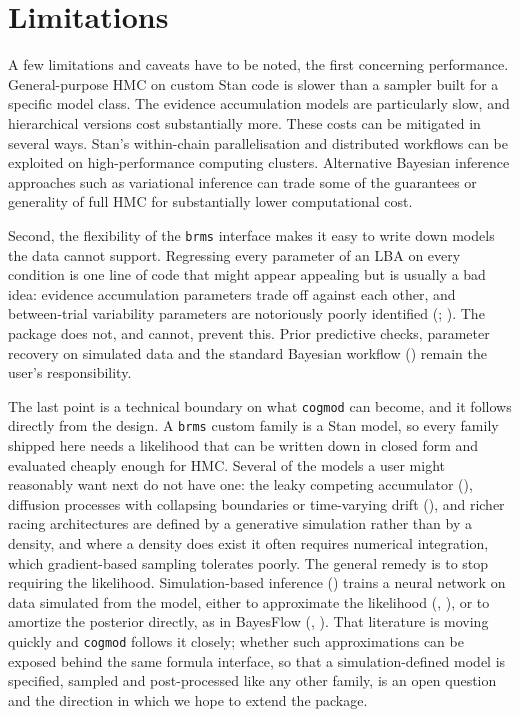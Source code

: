 \documentclass[
  jou,
  floatsintext,
  longtable,
  nolmodern,
  notxfonts,
  notimes,
  12pt,
  colorlinks=true,linkcolor=blue,citecolor=blue,urlcolor=blue]{apa7}
\begin{document}
\section{Limitations}\label{limitations}

A few limitations and caveats have to be noted, the first concerning
performance. General-purpose HMC on custom Stan code is slower than a
sampler built for a specific model class. The evidence accumulation
models are particularly slow, and hierarchical versions cost
substantially more. These costs can be mitigated in several ways. Stan's
within-chain parallelisation and distributed workflows can be exploited
on high-performance computing clusters. Alternative Bayesian inference
approaches such as variational inference can trade some of the
guarantees or generality of full HMC for substantially lower
computational cost.

Second, the flexibility of the \texttt{brms} interface makes it easy to
write down models the data cannot support. Regressing every parameter of
an LBA on every condition is one line of code that might appear
appealing but is usually a bad idea: evidence accumulation parameters
trade off against each other, and between-trial variability parameters
are notoriously poorly identified
(;
). The
package does not, and cannot, prevent this. Prior predictive checks,
parameter recovery on simulated data and the standard Bayesian workflow
() remain the
user's responsibility.

The last point is a technical boundary on what \texttt{cogmod} can
become, and it follows directly from the design. A \texttt{brms} custom
family is a Stan model, so every family shipped here needs a likelihood
that can be written down in closed form and evaluated cheaply enough for
HMC. Several of the models a user might reasonably want next do not have
one: the leaky competing accumulator (), diffusion processes with collapsing boundaries or
time-varying drift (), and richer racing architectures are defined by a generative
simulation rather than by a density, and where a density does exist it
often requires numerical integration, which gradient-based sampling
tolerates poorly. The general remedy is to stop requiring the
likelihood. Simulation-based inference
() trains a
neural network on data simulated from the model, either to approximate
the likelihood (, ), or to amortize the
posterior directly, as in BayesFlow
(,
). That literature is moving
quickly and \texttt{cogmod} follows it closely; whether such
approximations can be exposed behind the same formula interface, so that
a simulation-defined model is specified, sampled and post-processed like
any other family, is an open question and the direction in which we hope
to extend the package.
\end{document}
